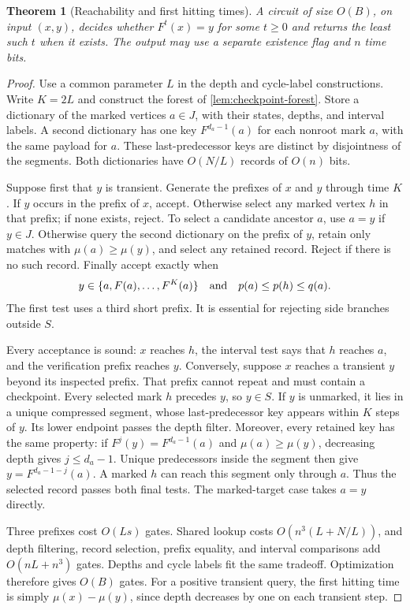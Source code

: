 \documentclass[11pt]{article}
\newtheorem{theorem}{Theorem}[section]
\theoremstyle{definition}
\theoremstyle{remark}
\numberwithin{equation}{section}
\begin{document}
\begin{theorem}[Reachability and first hitting times]\label{thm:reachability}
A circuit of size $O(B)$, on input $(x,y)$, decides whether
$F^t(x)=y$ for some $t\geq0$ and returns the least such $t$ when it exists.
The output may use a separate existence flag and $n$ time bits.
\end{theorem}
\begin{proof}
Use a common parameter $L$ in the depth and cycle-label constructions.
Write $K=2L$ and construct the forest of \cref{lem:checkpoint-forest}.
Store a dictionary of the marked vertices $a\in J$, with their states,
depths, and interval labels.  A second dictionary has one key
$F^{d_a-1}(a)$ for each nonroot mark $a$, with the same payload for $a$.
These last-predecessor keys are distinct by disjointness of the segments.
Both dictionaries have $O(N/L)$ records of $O(n)$ bits.

Suppose first that $y$ is transient.  Generate the prefixes of $x$ and
$y$ through time $K$.  If $y$ occurs in the prefix of $x$, accept.
Otherwise select any marked vertex $h$ in that prefix; if none exists,
reject.  To select a candidate ancestor $a$, use $a=y$ if $y\in J$.
Otherwise query the second dictionary on the prefix of $y$, retain only
matches with $\mu(a)\geq\mu(y)$, and select any retained record.  Reject
if there is no such record.  Finally accept exactly when
\[
 y\in\{a,F(a),\ldots,F^K(a)\}
 \quad\hbox{and}\quad p(a)\leq p(h)\leq q(a).
\]
The first test uses a third short prefix.  It is essential for rejecting
side branches outside $S$.

Every acceptance is sound: $x$ reaches $h$, the interval test says that
$h$ reaches $a$, and the verification prefix reaches $y$.  Conversely,
suppose $x$ reaches a transient $y$ beyond its inspected prefix.
That prefix cannot repeat and must contain a checkpoint.  Every selected
mark $h$ precedes $y$, so $y\in S$.  If $y$ is unmarked, it lies in a
unique compressed segment, whose last-predecessor key appears within
$K$ steps of $y$.  Its lower endpoint passes the depth filter.
Moreover, every retained key has the same property: if
$F^j(y)=F^{d_a-1}(a)$ and $\mu(a)\geq\mu(y)$, decreasing depth gives
$j\leq d_a-1$.  Unique predecessors inside the segment then give
$y=F^{d_a-1-j}(a)$.  A marked $h$ can reach this segment only through
$a$.  Thus the selected record passes both final tests.  The marked-target
case takes $a=y$ directly.

Three prefixes cost $O(Ls)$ gates.  Shared lookup costs
$O(n^3(L+N/L))$, and depth filtering, record selection, prefix equality,
and interval comparisons add $O(nL+n^3)$ gates.  Depths and cycle labels
fit the same tradeoff.  Optimization therefore gives $O(B)$ gates.
For a positive transient query, the first hitting time is simply
$\mu(x)-\mu(y)$, since depth decreases by one on each transient step.


\end{proof}
\end{document}

